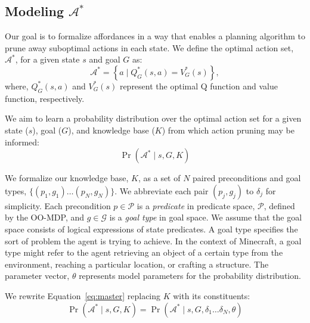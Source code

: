 \documentclass[letterpaper]{article}
\begin{document}
\subsection{Modeling $\mathcal{A}^*$}


Our goal is to formalize affordances in a way that enables a planning
algorithm to prune away suboptimal actions in each state. We define
the optimal action set, $\mathcal{A}^*$, for a given state $s$ and
goal $G$ as:
\begin{equation}
\mathcal{A}^* = \left\{ a \mid Q^*_G(s,a) = V^*_G(s) \right\}, 
\label{eq:opt_act_set}
\end{equation}
where, $Q^*_G(s,a)$ and $V^*_G(s)$ represent the optimal Q function and 
value function, respectively. 

We aim to learn a probability distribution over the optimal action set
for a given state ($s$), goal ($G$), and knowledge base ($K$) from
which action pruning may be informed:
\begin{equation}
\Pr(\mathcal{A}^* \mid s, G, K)
\label{eq:master}
\end{equation}

We formalize our knowledge base, $K$, as a set of $N$ paired preconditions and goal types, $\{ (p_1, g_1) 
\ldots (p_{N}, g_{N}) \}$. We abbreviate each pair $(p_j, g_j)$ to $\delta_j$ for simplicity. Each precondition $p \in \mathcal{P}$
is a {\it predicate} in predicate space, $\mathcal{P}$, defined by the OO-MDP, and
$g \in \mathcal{G}$ is a {\it goal type} in goal space. We assume that the goal space
consists of logical expressions of state predicates. A goal type specifies the sort of
problem the agent is trying to achieve. In the context of Minecraft, a goal type might refer
to the agent retrieving an object of a certain type from the environment, reaching a particular
location, or crafting a structure. The parameter vector, $\theta$ represents model parameters for the probability distribution.

We rewrite Equation~\ref{eq:master} replacing $K$ with its constituents:
\begin{equation}
\Pr(\mathcal{A}^* \mid s, G, K) = \Pr(\mathcal{A}^* \mid s, G, \delta_1 \ldots \delta_{N}, \theta)
\end{equation}
\end{document}

